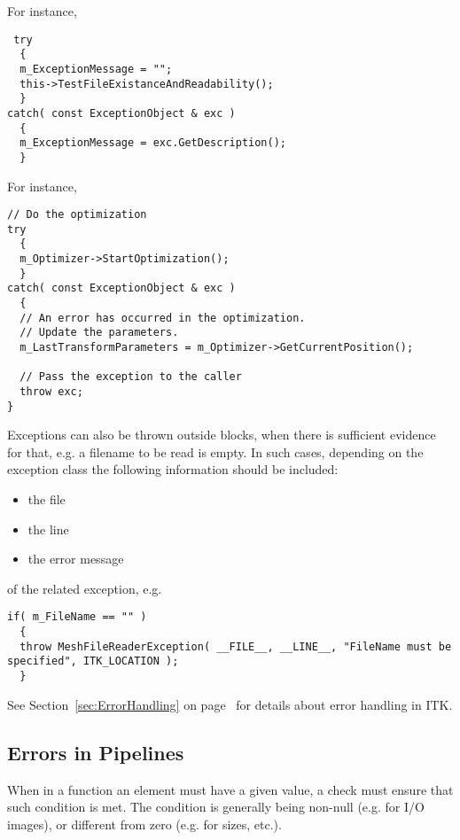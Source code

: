 For instance,

\small
\begin{verbatim}
 try
  {
  m_ExceptionMessage = "";
  this->TestFileExistanceAndReadability();
  }
catch( const ExceptionObject & exc )
  {
  m_ExceptionMessage = exc.GetDescription();
  }
\end{verbatim}
\normalsize

For instance,

\small
\begin{verbatim}
// Do the optimization
try
  {
  m_Optimizer->StartOptimization();
  }
catch( const ExceptionObject & exc )
  {
  // An error has occurred in the optimization.
  // Update the parameters.
  m_LastTransformParameters = m_Optimizer->GetCurrentPosition();

  // Pass the exception to the caller
  throw exc;
}
\end{verbatim}
\normalsize

Exceptions can also be thrown outside  blocks, when there is
sufficient evidence for that, e.g. a filename to be read is empty. In such
cases, depending on the exception class the following information should be
included:
\begin{itemize}
\item the file
\item the line
\item the error message
\end{itemize}
of the related exception, e.g.

\small
\begin{verbatim}
if( m_FileName == "" )
  {
  throw MeshFileReaderException( __FILE__, __LINE__, "FileName must be specified", ITK_LOCATION );
  }
\end{verbatim}
\normalsize

See Section~\ref{sec:ErrorHandling} on page~\pageref{sec:ErrorHandling} for
details about error handling in ITK.


\subsection{Errors in Pipelines}
\label{subsec:ErrorsInPipelines}

When in a function an element must have a given value, a check must ensure that
such condition is met. The condition is generally being non-null (e.g. for I/O
images), or different from zero (e.g. for sizes, etc.).

